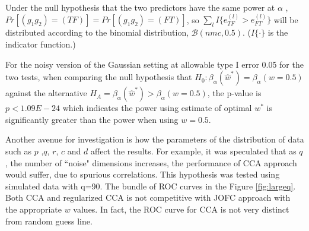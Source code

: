 \documentclass[11pt]{article} %
\begin{document}
Under the null  hypothesis that the two predictors have the same power at $\alpha$ ,
 $Pr[\left(g_1g_2\right)=(TF)]=Pr[\left(g_1g_2\right)=(FT)]$, so $\sum_l{I \{e_{TF}^{(l)}>e_{FT}^{(l)}\}}$ will be distributed according to  the binomial distribution, $\mathcal{B}(nmc,0.5)$. ($I\{\cdot\}$ is the indicator function.) 

For the noisy version of the Gaussian setting at allowable type I error 0.05 for the two tests, when comparing  the null hypothesis that  $H_{0}: \beta_{\alpha}({\hat{w}^*})=\beta_{\alpha}({w=0.5})$ against the alternative $H_{A}=\beta_{\alpha}({\hat{w}^*})>\beta_{\alpha}({w=0.5})$, the p-value is $p<1.09E-24$ which indicates the power using estimate of optimal $w^*$ is significantly greater than the power when using $w=0.5$. 


 Another avenue for investigation is  how the parameters of the distribution of  data such as $p$ ,$q$, $r$, $c$ and $d$ affect the results. For example, it was  speculated that as $q$, the number of   ``noise" dimensions increases, the performance of  CCA approach would suffer, due to spurious correlations. This hypothesis was tested using simulated data with q=90. The  bundle of ROC curves in the Figure \ref{fig:largeq}.  Both CCA and  regularized CCA is not competitive with JOFC approach with the appropriate $w$ values. In fact, the ROC curve for CCA is not very distinct from  random guess line.
\end{document}
